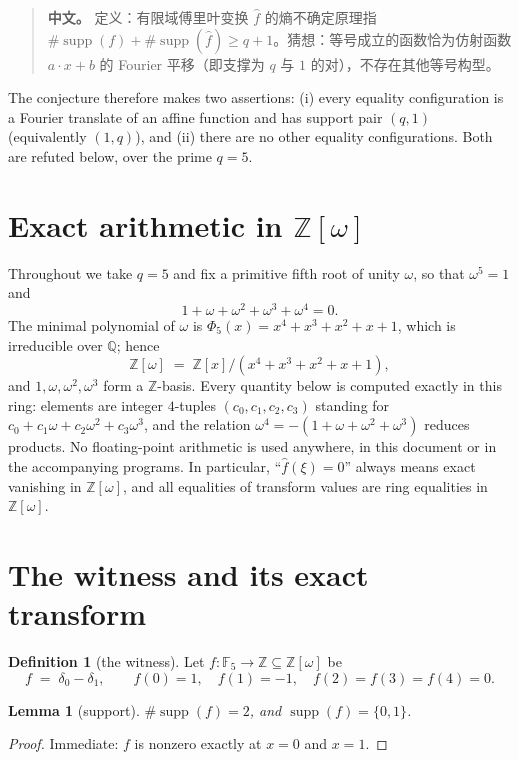 \documentclass[11pt]{article}
\newtheorem{lemma}[theorem]{Lemma}
\theoremstyle{definition}
\newtheorem{definition}[theorem]{Definition}
\theoremstyle{remark}
\newcommand{\F}{\mathbb{F}}
\newcommand{\Z}{\mathbb{Z}}
\newcommand{\supp}{\operatorname{supp}}
\newcommand{\fh}{\widehat{f}}
\begin{document}
\begin{quote}
\textbf{中文。} 定义：有限域傅里叶变换 $\fh$ 的熵不确定原理指
$\#\supp(f)+\#\supp(\fh) \ge q+1$。猜想：等号成立的函数恰为仿射函数
$a\cdot x+b$ 的 Fourier 平移（即支撑为 $q$ 与 $1$ 的对），不存在其他等号构型。
\end{quote}

The conjecture therefore makes two assertions: (i) every equality
configuration is a Fourier translate of an affine function and has support
pair $(q,1)$ (equivalently $(1,q)$), and (ii) there are no other equality
configurations. Both are refuted below, over the prime $q=5$.

\section{Exact arithmetic in $\Z[\omega]$}

Throughout we take $q=5$ and fix a primitive fifth root of unity $\omega$, so
that $\omega^5=1$ and
\[
1+\omega+\omega^2+\omega^3+\omega^4=0 .
\]
The minimal polynomial of $\omega$ is $\Phi_5(x)=x^4+x^3+x^2+x+1$, which is
irreducible over $\mathbb{Q}$; hence
\[
\Z[\omega]\;=\;\Z[x]/(x^4+x^3+x^2+x+1),
\]
and $1,\omega,\omega^2,\omega^3$ form a $\Z$-basis. Every quantity below is
computed exactly in this ring: elements are integer $4$-tuples
$(c_0,c_1,c_2,c_3)$ standing for $c_0+c_1\omega+c_2\omega^2+c_3\omega^3$,
and the relation $\omega^4=-(1+\omega+\omega^2+\omega^3)$ reduces products.
No floating-point arithmetic is used anywhere, in this document or in the
accompanying programs. In particular, ``$\fh(\xi)=0$'' always means exact
vanishing in $\Z[\omega]$, and all equalities of transform values are ring
equalities in $\Z[\omega]$.

\section{The witness and its exact transform}

\begin{definition}[the witness]
Let $f:\F_5\to\Z\subseteq\Z[\omega]$ be
\[
f \;=\; \delta_0-\delta_1, \qquad
f(0)=1,\quad f(1)=-1,\quad f(2)=f(3)=f(4)=0 .
\]
\end{definition}

\begin{lemma}[support]\label{lem:supp-f}
$\#\supp(f)=2$, and $\supp(f)=\{0,1\}$.
\end{lemma}
\begin{proof}
Immediate: $f$ is nonzero exactly at $x=0$ and $x=1$.
\end{proof}
\end{document}
